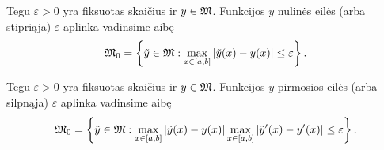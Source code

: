 
\begin{defn}
  Tegu $\varepsilon > 0$ yra fiksuotas skaičius ir $y \in \mathfrak{M}$.
  Funkcijos $y$ nulinės eilės (arba stipriąja) $\varepsilon$
  aplinka vadinsime aibę
  \begin{equation*}
    \MSET_{0} = \left\{ \tilde{y} \in \MSET :%
    \max _{x\in\left[ a, b \right]} | \tilde{y}(x) - y(x) | %
    \leq \varepsilon \right\}.
  \end{equation*}
\end{defn}

\begin{defn}
  Tegu $\varepsilon > 0$ yra fiksuotas skaičius ir $y \in \mathfrak{M}$.
  Funkcijos $y$ pirmosios eilės (arba silpnąja) $\varepsilon$
  aplinka vadinsime aibę
  \begin{equation*}
    \MSET_{0} = \left\{ \tilde{y} \in \MSET :%
    \max _{x\in\left[ a, b \right]} | \tilde{y}(x) - y(x) |%
    \max _{x\in\left[ a, b \right]} | \tilde{y}'(x) - y'(x) |%
    \leq \varepsilon \right\}.
  \end{equation*}
\end{defn}
